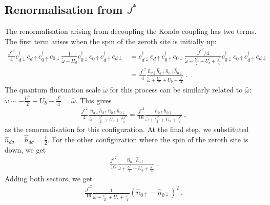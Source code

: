 \subsection{Renormalisation from \(J^*\)}
The renormalisation arising from decoupling the Kondo coupling has two terms. The first term arises when the spin of the zeroth site is initially up:
\begin{eqnarray}
	\frac{{J^*}^2}{4}c^\dagger_{d \downarrow}c_{d \uparrow} c^\dagger_{0 \uparrow}c_{0 \downarrow} \frac{1}{\tilde \omega - H_d} c^\dagger_{0 \downarrow}c_{0 \uparrow} c^\dagger_{d \uparrow}c_{d \downarrow} &= c^\dagger_{d \downarrow}c_{d \uparrow} c^\dagger_{0 \uparrow}c_{0 \downarrow} \frac{{J^*}^2/4}{\tilde \omega + \frac{U^*}{2} + U_b + \frac{J^*}{4}} c^\dagger_{0 \downarrow}c_{0 \uparrow} c^\dagger_{d \uparrow}c_{d \downarrow} \nonumber\\
																										   &= \frac{{J^*}^2}{4}\frac{\hat n_{d \downarrow} \hat h_{d \uparrow} \hat n_{ 0 \uparrow} \hat h_{0 \downarrow}}{\tilde \omega + \frac{U^*}{2} + U_b + \frac{J^*}{4}} ~.
\end{eqnarray}
The quantum fluctuation scale \(\tilde \omega\) for this process can be similarly related to \(\bar\omega\): \(\tilde\omega \sim -\frac{U^*}{2} - U_b - \frac{J^*}{4} = \bar\omega\). This gives
\begin{eqnarray}
	\frac{{J^*}^2}{4}\frac{\hat n_{d \downarrow} \hat h_{d \uparrow} \hat n_{ 0 \uparrow} \hat h_{0 \downarrow}}{\bar\omega + \frac{U^*}{2} + U_b + \frac{3J^*}{4}} = \frac{{J^*}^2}{16}\frac{\hat n_{ 0 \uparrow} \hat h_{0 \downarrow}}{\bar\omega + \frac{U^*}{2} + U_b + \frac{J^*}{4}}~,
\end{eqnarray}
as the renormalisation for this configuration. At the final step, we substituted \(\hat n_{d\sigma} = \hat h_{d\sigma} = \frac{1}{2}\). For the other configuration where the spin of the zeroth site is down, we get
\begin{eqnarray}
	\frac{{J^*}^2}{16}\frac{\hat n_{ 0 \downarrow} \hat h_{0 \uparrow}}{\bar\omega + \frac{U^*}{2} + U_b + \frac{J^*}{4}}~.
\end{eqnarray}
Adding both sectors, we get
\begin{eqnarray}
	\frac{{J^*}^2}{16}\frac{1}{\bar\omega + \frac{U^*}{2} + U_b + \frac{J^*}{4}} \left(\hat n_{ 0\uparrow} - \hat n_{0 \downarrow}\right)^2~.
\end{eqnarray}

